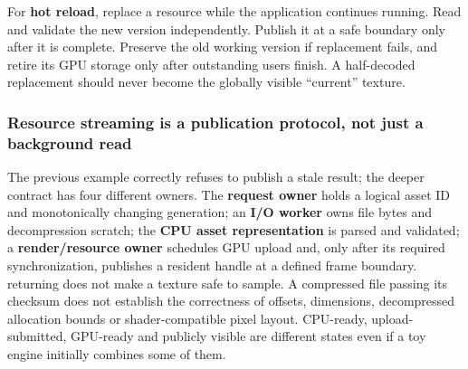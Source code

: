 For \textbf{hot reload}, replace a resource while the application continues running. Read and validate the new version independently. Publish it at a safe boundary only after it is complete. Preserve the old working version if replacement fails, and retire its GPU storage only after outstanding users finish. A half-decoded replacement should never become the globally visible ``current'' texture.

\subsubsection{Resource streaming is a publication protocol, not just a background read}\label{06-engine-ii-ch027-resource-streaming-is-a-publication-protocol-not-just-a-background-read}

\hypertarget{06-engine-ii-ch027-resource-streaming-is-a-publication-protocol-not-just-a-background-read}{}

The previous example correctly refuses to publish a stale result; the deeper contract has four different owners. The \textbf{request owner} holds a logical asset ID and monotonically changing generation; an \textbf{I/O worker} owns file bytes and decompression scratch; the \textbf{CPU asset representation} is parsed and validated; a \textbf{render/resource owner} schedules GPU upload and, only after its required synchronization, publishes a resident handle at a defined frame boundary.  returning does not make a texture safe to sample. A compressed file passing its checksum does not establish the correctness of offsets, dimensions, decompressed allocation bounds or shader-compatible pixel layout. CPU-ready, upload-submitted, GPU-ready and publicly visible are different states even if a toy engine initially combines some of them.

